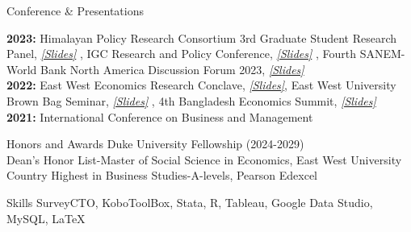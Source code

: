 \documentclass[
	11pt, %
]{resume} %
\begin{document}
	\vspace{-5pt}
\begin{rSection}{Conference \& Presentations} 

 \textbf{2023:} Himalayan Policy Research Consortium 3rd Graduate Student Research Panel,  \textit{\href{https://drive.google.com/file/d/1c9OJ8KnxRb3NdGvUFLuZDAEZU23Q6XjM/view?usp=sharing}{[Slides]}} , IGC Research and Policy Conference, \textit{\href{https://drive.google.com/file/d/1tcRIY8yxC01FdsVJsKmR4vaRdW0Yn3bb/view?usp=sharing}{[Slides]}} , Fourth SANEM-World Bank North America Discussion Forum 2023, \textit{\href{https://drive.google.com/file/d/1qjbrjKkHRWeoh3wKIsvkR1mJkWT9Fw9N/view?usp=sharing}{[Slides]}} \\
 \textbf{2022:} East West Economics Research Conclave, \textit{\href{https://drive.google.com/file/d/1TUbtHcgI-sgZE9GFSnNAmb4yfXD8yjDS/view?usp=sharing}{[Slides]}}, East West University Brown Bag Seminar,  \textit{\href{https://drive.google.com/file/d/1tOFNpG46qjF2K_2QMGyzyqxcxz4gJK2q/view?usp=sharing}{[Slides]}} , 4th Bangladesh Economics Summit, \textit{\href{https://drive.google.com/file/d/1tmlU19aaJJR7mLwPncVduP_Gg7TQjVrH/view?usp=sharing}{[Slides]}} \\
 \textbf{2021:} International Conference on Business and Management
\end{rSection}


	\vspace{-6pt}
\begin{rSection}{Honors and Awards} 
	Duke University Fellowship (2024-2029) \\
	Dean's Honor List-Master of Social Science in Economics, East West University \\
	Country Highest in Business Studies-A-levels,  Pearson Edexcel
\end{rSection}


\begin{rSection}{Skills}
SurveyCTO, KoboToolBox,  Stata, R, Tableau, Google Data Studio, MySQL, \LaTeX
\end{rSection}
\end{document}
